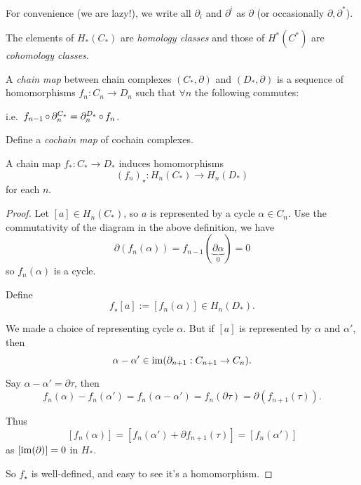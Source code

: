 \documentclass[a4paper,11pt]{article}
\begin{document}
	\begin{nt}
		For convenience (we are lazy!), we write all $\partial_i$ and $\partial^i$ as $\partial$ (or occasionally $\partial,\partial^*$).
	\end{nt}

	\begin{defi}
		The elements of $H_*(C_*)$ are \emph{homology classes} and those of $H^*(C^*)$ are \emph{cohomology classes}.
	\end{defi}

	\begin{defi}
		A \emph{chain map} between chain complexes $(C_*,\partial)$ and $(D_*,\partial)$ is a sequence of homomorphisms $f_n : C_n \to D_n$ such that $\forall n$ the following commutes:
		\begin{center}
		\end{center}
		i.e.\ $f_{n-1} \operatorname{\circ} \partial_n^{C_*} = \partial_n^{D_*} \operatorname{\circ} f_n$. 
	\end{defi}

	\begin{exer}
		Define a \emph{cochain map} of cochain complexes.
	\end{exer}

	\begin{lem}
		A chain map $f_* : C_* \to D_*$ induces homomorphisms
		\[
			(f_n)_\star : H_n (C_*) \to H_n(D_*)
		\]
		for each $n$.
	\end{lem}

	\begin{proof}
		Let $[a] \in H_n (C_*)$, so $a$ is represented by a cycle $\alpha \in C_n$. Use the commutativity of the diagram in the above definition, we have
		\[
			\partial(f_n (\alpha)) = f_{n-1}(\underbrace{\partial \alpha}_{0}) = 0
		\]
		so $f_n (\alpha)$ is a cycle.

		Define
		\[
			f_\star [a] := [f_n(\alpha)] \in H_n(D_*).
		\]
		
		We made a choice of representing cycle $\alpha$. But if $[a]$ is represented by $\alpha$ and $\alpha'$, then
		\[
			\alpha - \alpha' \in \operatorname{im}(\partial_{n+1}: C_{n+1} \to C_n).
		\]
		
		Say $\alpha - \alpha' = \partial \tau$, then
		\[
			f_n (\alpha) - f_n(\alpha') = f_n (\alpha - \alpha') = f_n (\partial\tau) = \partial(f_{n+1}(\tau)).
		\]
		
		Thus
		\[
			[f_n (\alpha)] = [f_n (\alpha') + \partial f_{n+1}(\tau)] = [f_n (\alpha')]
		\]
		as $[\operatorname{im}(\partial)] = 0$ in $H_*$.
		
		So $f_{\star}$ is well-defined, and easy to see it's a homomorphism.
	\end{proof}
\end{document}
